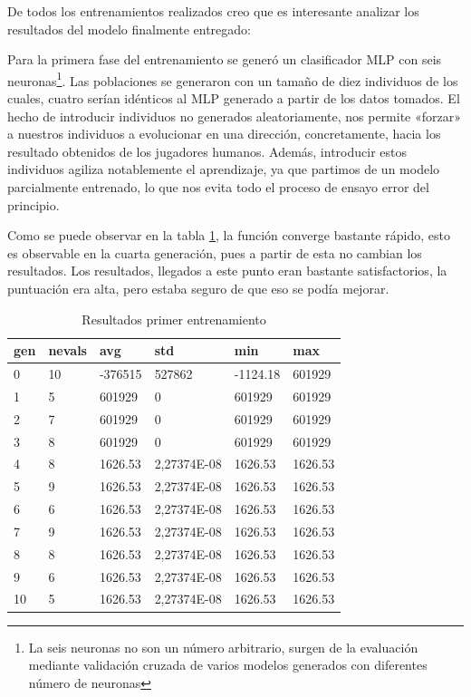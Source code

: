 De todos los entrenamientos realizados creo que es interesante analizar los resultados del modelo finalmente entregado:



Para la primera fase del entrenamiento se generó un clasificador MLP con seis neuronas\footnote{La seis neuronas no son un número arbitrario, surgen de la evaluación mediante validación cruzada de varios modelos generados con diferentes número de neuronas}. Las poblaciones se generaron con un tamaño de diez individuos de los cuales, cuatro serían idénticos al MLP generado a partir de los datos tomados. El hecho de introducir individuos no generados aleatoriamente, nos permite «forzar» a nuestros individuos a evolucionar en una  dirección, concretamente, hacia los resultado obtenidos de los jugadores humanos. Además, introducir estos individuos agiliza notablemente el aprendizaje, ya que partimos de un modelo parcialmente entrenado, lo que nos evita todo el proceso de ensayo error del principio.

Como se puede observar en la tabla \ref{result_primer_entr}, la función converge bastante rápido, esto es observable en la cuarta generación, pues a partir de esta no cambian los resultados. Los resultados, llegados a este punto eran bastante satisfactorios, la puntuación era alta, pero estaba seguro de que eso se podía mejorar.


\begin{table}[]
\centering
\begin{tabular}{|l|l|l|l|l|l|}
\hline
\rowcolor[HTML]{C0C0C0} 
gen & nevals & avg     & std         & min      & max     \\ \hline
0   & 10     & -376515 & 527862      & -1124.18 & 601929  \\ \hline
1   & 5      & 601929  & 0           & 601929   & 601929  \\ \hline
2   & 7      & 601929  & 0           & 601929   & 601929  \\ \hline
3   & 8      & 601929  & 0           & 601929   & 601929  \\ \hline
4   & 8      & 1626.53 & 2,27374E-08 & 1626.53  & 1626.53 \\ \hline
5   & 9      & 1626.53 & 2,27374E-08 & 1626.53  & 1626.53 \\ \hline
6   & 6      & 1626.53 & 2,27374E-08 & 1626.53  & 1626.53 \\ \hline
7   & 9      & 1626.53 & 2,27374E-08 & 1626.53  & 1626.53 \\ \hline
8   & 8      & 1626.53 & 2,27374E-08 & 1626.53  & 1626.53 \\ \hline
9   & 6      & 1626.53 & 2,27374E-08 & 1626.53  & 1626.53 \\ \hline
10  & 5      & 1626.53 & 2,27374E-08 & 1626.53  & 1626.53 \\ \hline
\end{tabular}
\caption{Resultados primer entrenamiento}
\label{result_primer_entr}
\end{table}



